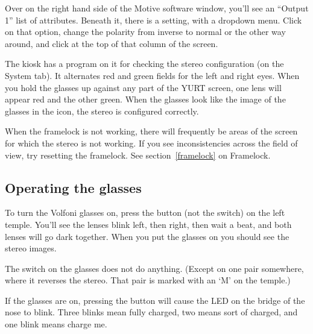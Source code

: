 \documentclass[11pt]{article}
\newcommand{\yurt}{YURT\xspace}
\newcommand{\menu}[1]{``#1''\xspace}
\newcommand{\button}[1]{\framebox{\textsf{#1}\xspace}}
\begin{document}
Over on the right hand side of the Motive software window, you'll see
an \menu{Output 1} list of attributes.  Beneath it, there is a
\button{Polarity} setting, with a dropdown menu.  Click on that option,
change the polarity from inverse to normal or the other way around,
and click \button{Apply} at the top of that column of the screen.


The kiosk has a program on it for checking the stereo configuration
(on the System tab).  It alternates red and green fields for the left
and right eyes.  When you hold the glasses up against any part of the
\yurt screen, one lens will appear red and the other green.  When the
glasses look like the image of the glasses in the icon, the stereo is
configured correctly.  

When the framelock is not working, there will frequently be areas of
the screen for which the stereo is not working.  If you see
inconsistencies across the field of view, try resetting the
framelock.  See section~\ref{framelock} on Framelock. 


\iffalse

You can also toggle the stereo by turning projector 11 stereo off and
then on again.

\begin{verbatim}
$ pjcontrol 11 mono
$ pjcontrol 11 stereo
\end{verbatim}

There is only a 50\% chance that this procedure will leave the system
in the correct state, so you may have to try it a few times before it
works properly.  Take comfort in the fact that there is only a 6.25\%
chance you'll have to do it more than four times.

\fi

\subsection{Operating the glasses}

To turn the Volfoni glasses on, press the button (not the switch) on
the left temple.  You'll see the lenses blink left, then right, then
wait a beat, and both lenses will go dark together.  When you put the
glasses on you should see the stereo images.

The switch on the glasses does not do
anything.  (Except on one pair somewhere, where it reverses the
stereo.  That pair is marked with an `M' on the temple.)

If the glasses are on, pressing the button will cause the LED on the
bridge of the nose to blink.  Three blinks mean fully charged, two
means sort of charged, and one blink means charge me.
\end{document}

